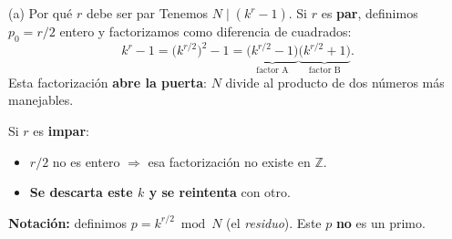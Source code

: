 \documentclass[aspectratio=169]{beamer}
\begin{document}
\begin{frame}{(a) Por qué $r$ debe ser par}
  Tenemos $N\mid(k^r-1)$. Si $r$ es \textbf{par}, definimos $p_0=r/2$ entero
  y factorizamos como diferencia de cuadrados:
  \[
    k^r - 1
    = \bigl(k^{r/2}\bigr)^2 - 1
    = \underbrace{\bigl(k^{r/2}-1\bigr)}_{\text{factor A}}
      \underbrace{\bigl(k^{r/2}+1\bigr)}_{\text{factor B}}.
  \]
  Esta factorización \textbf{abre la puerta}: $N$ divide al producto de dos
  números más manejables.

  \vspace{0.3em}
  Si $r$ es \textbf{impar}:
  \begin{itemize}
    \item $r/2$ no es entero $\Rightarrow$ esa factorización no existe en $\mathbb{Z}$.
    \item \textbf{Se descarta este $k$ y se reintenta} con otro.
  \end{itemize}

  \begin{block}{}
    \small \textbf{Notación:} definimos $p = k^{r/2}\bmod N$ (el \emph{residuo}).
    Este $p$ \textbf{no} es un primo.
  \end{block}

\end{frame}
\end{document}
